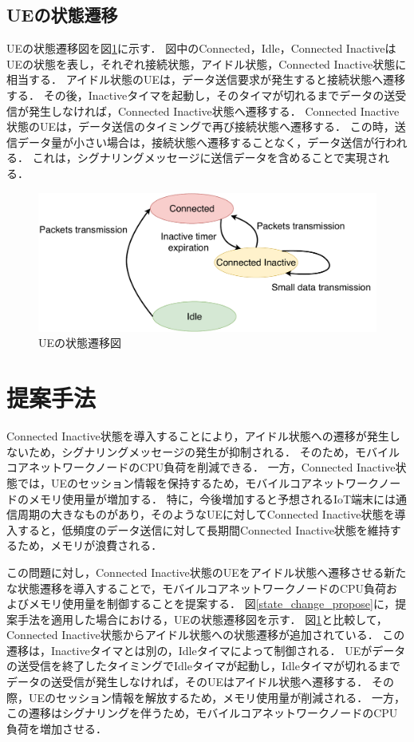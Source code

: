 \documentclass[technicalreport]{ieicej-rev}
\begin{document}
  \subsection{UEの状態遷移}
  UEの状態遷移図を図\ref{state_change_inactive}に示す．
  図中のConnected，Idle，Connected InactiveはUEの状態を表し，それぞれ接続状態，アイドル状態，Connected Inactive状態に相当する．
  アイドル状態のUEは，データ送信要求が発生すると接続状態へ遷移する．
  その後，Inactiveタイマを起動し，そのタイマが切れるまでデータの送受信が発生しなければ，Connected Inactive状態へ遷移する．
  Connected Inactive状態のUEは，データ送信のタイミングで再び接続状態へ遷移する．
  この時，送信データ量が小さい場合は，接続状態へ遷移することなく，データ送信が行われる．
  これは，シグナリングメッセージに送信データを含めることで実現される．
  \begin{figure}[!t]
    \centering
    \includegraphics[width=1.0\hsize]{state_change_inactive.pdf}
    \caption{UEの状態遷移図}
    \label{state_change_inactive}
  \end{figure}



\section{提案手法}
\label{sec:propose}
Connected Inactive状態を導入することにより，アイドル状態への遷移が発生しないため，シグナリングメッセージの発生が抑制される．
そのため，モバイルコアネットワークノードのCPU負荷を削減できる．
一方，Connected Inactive状態では，UEのセッション情報を保持するため，モバイルコアネットワークノードのメモリ使用量が増加する．
特に，今後増加すると予想されるIoT端末には通信周期の大きなものがあり，そのようなUEに対してConnected Inactive状態を導入すると，低頻度のデータ送信に対して長期間Connected Inactive状態を維持するため，メモリが浪費される．

この問題に対し，Connected Inactive状態のUEをアイドル状態へ遷移させる新たな状態遷移を導入することで，モバイルコアネットワークノードのCPU負荷およびメモリ使用量を制御することを提案する．
図\ref{state_change_propose}に，提案手法を適用した場合における，UEの状態遷移図を示す．
図\ref{state_change_inactive}と比較して，Connected Inactive状態からアイドル状態への状態遷移が追加されている．
この遷移は，Inactiveタイマとは別の，Idleタイマによって制御される．
UEがデータの送受信を終了したタイミングでIdleタイマが起動し，Idleタイマが切れるまでデータの送受信が発生しなければ，そのUEはアイドル状態へ遷移する．
その際，UEのセッション情報を解放するため，メモリ使用量が削減される．
一方，この遷移はシグナリングを伴うため，モバイルコアネットワークノードのCPU負荷を増加させる．
\end{document}
